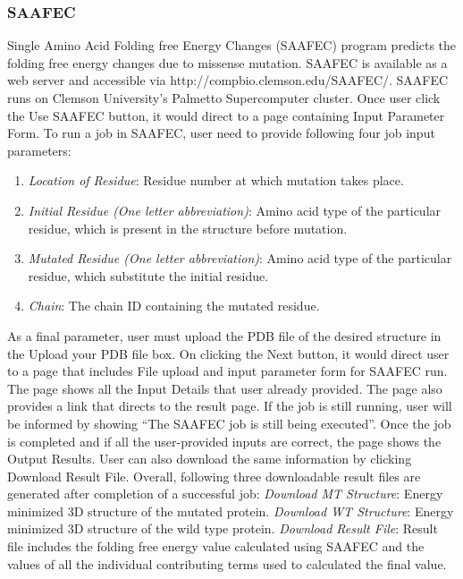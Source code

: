 \documentclass[9pt,tutorial]{livecoms}
\begin{document}
\subsubsection{SAAFEC} Single Amino Acid Folding free Energy Changes (SAAFEC) program\cite{getov2016saafec} predicts the folding free energy changes due to missense mutation. SAAFEC is available as a web server and accessible via http://compbio.clemson.edu/SAAFEC/. SAAFEC runs on Clemson University’s Palmetto Supercomputer cluster. Once user click the Use SAAFEC button, it would direct to a page containing Input Parameter Form. To run a job in SAAFEC, user need to provide following four job input parameters:
\begin{enumerate}
\item \textit{Location of Residue}: Residue number at which mutation takes place.
\item \textit{Initial Residue (One letter abbreviation)}: Amino acid type of the particular residue, which is present in the structure before mutation.
\item \textit{Mutated Residue (One letter abbreviation)}: Amino acid type of the particular residue, which substitute the initial residue. 
\item \textit{Chain}: The chain ID containing the mutated residue.
\end{enumerate}
As a final parameter, user must upload the PDB file of the desired structure in the Upload your PDB file box. On clicking the Next button, it would direct user to a page that includes File upload and input parameter form for SAAFEC run. The page shows all the Input Details that user already provided. The page also provides a link that directs to the result page. If the job is still running, user will be informed by showing “The SAAFEC job is still being executed”. Once the job is completed and if all the user-provided inputs are correct, the page shows the Output Results. User can also download the same information by clicking Download Result File. Overall, following three downloadable result files are generated after completion of a successful job:
\textit{Download MT Structure}: Energy minimized 3D structure of the mutated protein.
\textit{Download WT Structure}: Energy minimized 3D structure of the wild type protein.
\textit{Download Result File}: Result file includes the folding free energy value calculated using SAAFEC and the values of all the individual contributing terms used to calculated the final value. 
\end{document}
